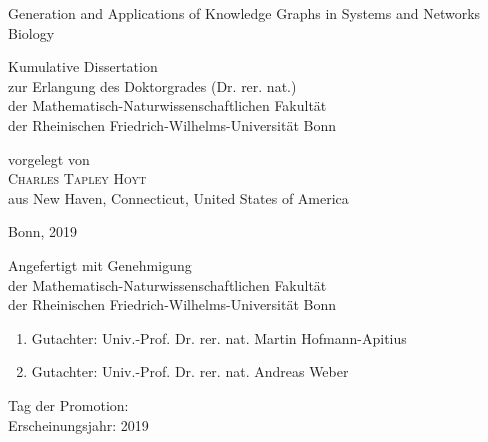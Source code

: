 \begin{titlepage} %

    \begin{center}
        \fontsize{28}{36}\selectfont %

        Generation and Applications of Knowledge Graphs in Systems and Networks Biology

        \vspace{3.5cm} %
        \renewcommand{\baselinestretch}{1.5} %
        \large

        Kumulative Dissertation \\
        zur Erlangung des Doktorgrades (Dr. rer. nat.)\\
        der Mathematisch-Naturwissenschaftlichen Fakult\"at \\
        der Rheinischen Friedrich-Wilhelms-Universit\"at Bonn \\

        \vspace{2.0cm}
        \renewcommand{\baselinestretch}{1.1}

        vorgelegt von \\
        \textsc{Charles Tapley Hoyt} \\
        aus New Haven, Connecticut, United States of America \\

        \renewcommand{\baselinestretch}{1}
        \vspace{1.0cm}

        Bonn, 2019 \\
    \end{center}
\end{titlepage}

\newpage\null\newpage

\begin{flushleft} %
    \vspace*{12cm}
    \large

    Angefertigt mit Genehmigung \\
    der Mathematisch-Naturwissenschaftlichen Fakult\"at \\
    der Rheinischen Friedrich-Wilhelms-Universit\"at Bonn \\

    \vspace{1.5cm}
    \renewcommand{\baselinestretch}{1.6}

    \begin{enumerate}
        \item Gutachter: Univ.-Prof. Dr. rer. nat. Martin Hofmann-Apitius
        \item Gutachter: Univ.-Prof. Dr. rer. nat. Andreas Weber
    \end{enumerate}
    Tag der Promotion:\\
    Erscheinungsjahr: 2019 \\

\end{flushleft}
\newpage\null\newpage

\setlength{\parskip}{1em} %
\renewcommand{\baselinestretch}{1.2} %






\tableofcontents
\listoffigures
\listoftables
